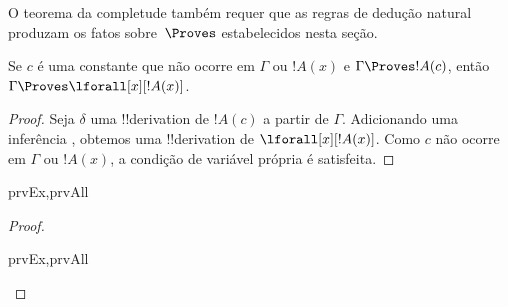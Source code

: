 \documentclass[../../../include/open-logic-section]{subfiles}
\begin{document}


\begin{explain}
  O teorema da completude também requer que as regras de dedução
  natural produzam os fatos sobre~$\Proves$ estabelecidos nesta seção.
\end{explain}

\begin{thm}
 Se $c$ é uma constante que não
ocorre em $\Gamma$ ou $!A(x)$ e $\Gamma \Proves !A(c)$, então $\Gamma
\Proves \lforall[x][!A(x)]$.
\end{thm}

\begin{proof}
Seja $\delta$ uma !!{derivation} de $!A(c)$ a partir de $\Gamma$.
Adicionando uma inferência \Intro{\lforall}, obtemos uma !!{derivation}
de $\lforall[x][!A(x)]$. Como $c$ não ocorre em $\Gamma$ ou $!A(x)$,
a condição de variável própria é satisfeita.
\end{proof}

\begin{prop}
\begin{tagenumerate}{prvEx,prvAll}

\end{tagenumerate}
\end{prop}

\begin{proof}
\begin{tagenumerate}{prvEx,prvAll}

\end{tagenumerate}
\end{proof}
\end{document}
